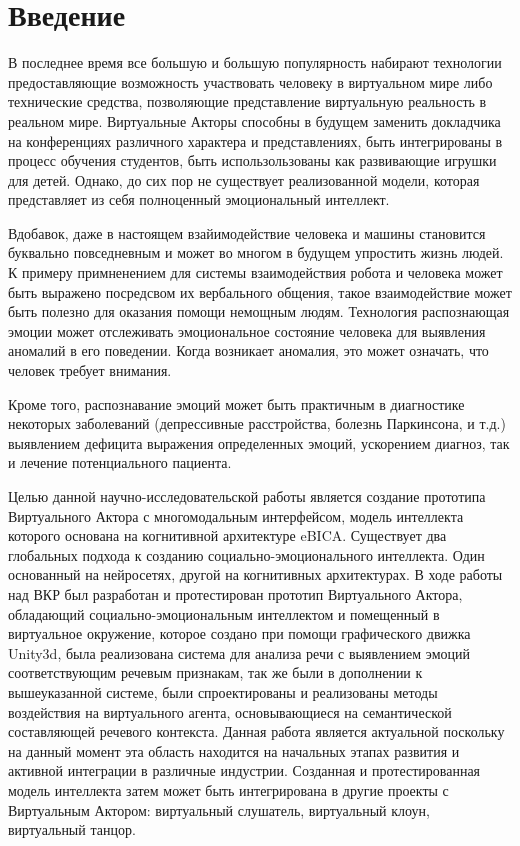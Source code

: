 \chapter*{Введение}
\label{sec:afterwords}


В последнее время все большую и большую популярность набирают технологии предоставляющие возможность участвовать человеку 
в виртуальном мире либо технические средства, позволяющие представление виртуальную реальность в реальном мире.
Виртуальные Акторы способны в будущем заменить докладчика на конференциях различного характера и представлениях,
быть интегрированы в процесс обучения студентов, быть использользованы как развивающие игрушки для детей.
Однако, до сих пор не существует реализованной модели, которая представляет из себя полноценный эмоциональный интеллект.

Вдобавок, даже в настоящем взайимодействие человека и машины становится буквально повседневным и может во многом
в будущем упростить жизнь людей. К примеру примненением для системы взаимодействия робота и человека может быть 
выражено посредсвом их вербального общения, такое взаимодействие может быть полезно для оказания помощи немощным людям. 
Технология распознающая эмоции может отслеживать эмоциональное состояние человека для выявления аномалий в его поведении. 
Когда возникает аномалия, это может означать, что человек требует внимания.

Кроме того, распознавание эмоций может быть практичным в диагностике некоторых заболеваний 
(депрессивные расстройства, болезнь Паркинсона,
и т.д.) 
выявлением дефицита выражения определенных эмоций, ускорением диагноз, так и лечение потенциального пациента.


Целью данной научно-исследовательской работы является создание прототипа Виртуального Актора с многомодальным интерфейсом, 
модель интеллекта которого основана на когнитивной архитектуре eBICA.
Существует два глобальных подхода к созданию социально-эмоционального интеллекта. 
Один основанный на нейросетях, другой на когнитивных архитектурах.
В ходе работы над ВКР был разработан и протестирован прототип Виртуального Актора, 
обладающий социально-эмоциональным интеллектом и помещенный в виртуальное окружение, которое создано при помощи графического движка Unity3d, 
была реализована система для анализа речи с выявлением эмоций соответствующим речевым признакам, так же были
в дополнении к вышеуказанной системе, были спроектированы и реализованы методы 
воздействия на виртуального агента, основывающиеся на семантической составляющей речевого контекста.
Данная работа является актуальной поскольку на данный момент эта область находится на начальных этапах 
развития и активной интеграции в различные индустрии.
Созданная и протестированная модель интеллекта затем может быть интегрирована в другие проекты с 
Виртуальным Актором: виртуальный слушатель, виртуальный клоун, виртуальный танцор. 

